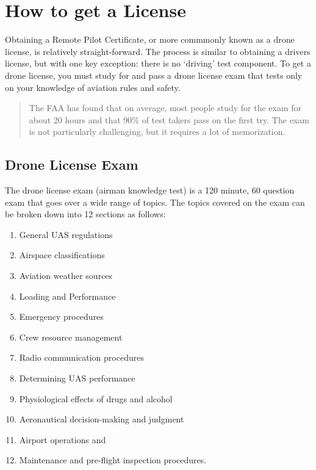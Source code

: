 \documentclass[
]{book}
\providecommand{\tightlist}{%
  \setlength{\itemsep}{0pt}\setlength{\parskip}{0pt}}
\begin{document}
\hypertarget{ch-get-license}{%
\chapter{How to get a License}\label{ch-get-license}}

Obtaining a Remote Pilot Certificate, or more commmonly known as a drone license, is relatively straight-forward. The process is similar to obtaining a drivers license, but with one key exception: there is no `driving' test component. To get a drone license, you must study for and pass a drone license exam that tests only on your knowledge of aviation rules and safety.

\begin{quote}
The FAA has found that on average, most people study for the exam for about 20 hours and that 90\% of test takers pass on the first try. The exam is not particularly challenging, but it requires a lot of memorization.
\end{quote}

\hypertarget{drone-license-exam}{%
\section{Drone License Exam}\label{drone-license-exam}}

The drone license exam (airman knowledge test) is a 120 minute, 60 question exam that goes over a wide range of topics. The topics covered on the exam can be broken down into 12 sections as follows:

\begin{enumerate}
\def\labelenumi{\arabic{enumi}.}
\tightlist
\item
  General UAS regulations
\item
  Airspace classifications
\item
  Aviation weather sources
\item
  Loading and Performance
\item
  Emergency procedures
\item
  Crew resource management
\item
  Radio communication procedures
\item
  Determining UAS performance
\item
  Physiological effects of drugs and alcohol
\item
  Aeronautical decision-making and judgment
\item
  Airport operations
  and
\item
  Maintenance and pre-flight inspection procedures.
\end{enumerate}
\end{document}
